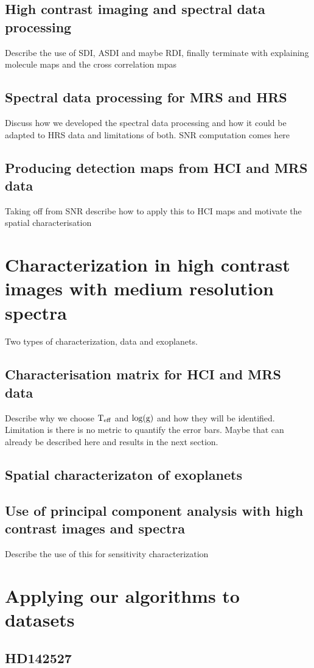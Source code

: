 \section{High contrast imaging and spectral data processing}
Describe the use of SDI, ASDI and maybe RDI, finally terminate with explaining molecule maps and the cross correlation mpas
\section{Spectral data processing for MRS and HRS}
Discuss how we developed the spectral data processing and how it could be adapted to HRS data and limitations of both.
SNR computation comes here
\section{Producing detection maps from HCI and MRS data}
Taking off from SNR describe how to apply this to HCI maps and motivate the spatial characterisation
\chapter{Characterization in high contrast images with medium resolution spectra}
Two types of characterization, data and exoplanets.
\section{Characterisation matrix for HCI and MRS data}
Describe why we choose $\rm{T_{eff}}$ and $\log(\rm{g})$ and how they will be identified. 
Limitation is there is no metric to quantify the error bars. Maybe that can already be described here and results in the next section.
\section{Spatial characterizaton of exoplanets}
\section{Use of principal component analysis with high contrast images and spectra}
Describe the use of this for sensitivity characterization

\chapter{Applying our algorithms to datasets}
\section{HD142527}
